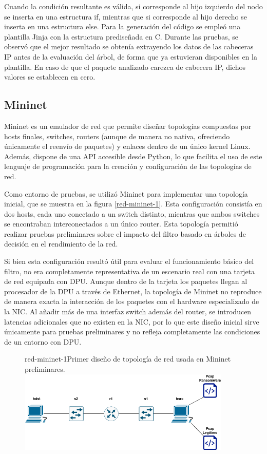 Cuando la condición resultante es válida, si corresponde al hijo izquierdo del nodo se inserta en una estructura if, mientras que si corresponde al hijo derecho se inserta en una estructura else. Para la generación del código se empleó una plantilla Jinja con la estructura prediseñada en C. Durante las pruebas, se observó que el mejor resultado se obtenía extrayendo los datos de las cabeceras IP antes de la evaluación del árbol, de forma que ya estuvieran disponibles en la plantilla. En caso de que el paquete analizado carezca de cabecera IP, dichos valores se establecen en cero.

\subsection{Mininet}
Mininet es un emulador de red que permite diseñar topologías compuestas por hosts finales, switches, routers (aunque de manera no nativa, ofreciendo únicamente el reenvío de paquetes) y enlaces dentro de un único kernel Linux. Además, dispone de una API accesible desde Python, lo que facilita el uso de este lenguaje de programación para la creación y configuración de las topologías de red\cite{lantz2021mininet}.

Como entorno de pruebas, se utilizó Mininet para implementar una topología inicial, que se muestra en la figura \ref{red-mininet-1}. Esta configuración consistía en dos hosts, cada uno conectado a un switch distinto, mientras que ambos switches se encontraban interconectados a un único router. Esta topología permitió realizar pruebas preliminares sobre el impacto del filtro basado en árboles de decisión en el rendimiento de la red.

Si bien esta configuración resultó útil para evaluar el funcionamiento básico del filtro, no era completamente representativa de un escenario real con una tarjeta de red equipada con DPU. Aunque dentro de la tarjeta los paquetes llegan al procesador de la DPU a través de Ethernet, la topología de Mininet no reproduce de manera exacta la interacción de los paquetes con el hardware especializado de la NIC. Al añadir más de una interfaz switch además del router, se introducen latencias adicionales que no existen en la NIC, por lo que este diseño inicial sirve únicamente para pruebas preliminares y no refleja completamente las condiciones de un entorno con DPU.

\begin{figure}[Primera Topología de Red]{red-mininet-1}{Primer diseño de topología de red usada en Mininet preliminares.}
	\includegraphics[width=0.9\textwidth]{capturas/DiagramaRedArbol1.png}
\end{figure}


